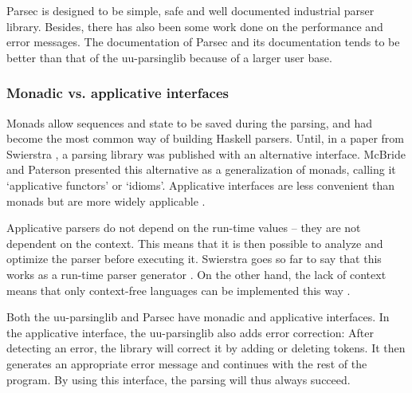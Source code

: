 Parsec is designed to be simple, safe and well documented industrial parser library.
Besides, there has also been some work done on the performance and error messages.
The documentation of Parsec and its documentation tends to be better than that of the uu-parsinglib because of a larger user base.


\subsubsection{Monadic vs. applicative interfaces}
Monads allow sequences and state to be saved during the parsing, and had become the most common way of building Haskell parsers.
Until, in a paper from Swierstra , a parsing library was published with an alternative interface.
McBride and Paterson presented this alternative as a generalization of monads, calling it `applicative functors' or `idioms'.
Applicative interfaces are less convenient than monads but are more widely applicable .

Applicative parsers do not depend on the run-time values -- they are not dependent on the context.
This means that it is then possible to analyze and optimize the parser before executing it.
Swierstra goes so far to say that this works as a run-time parser generator .
On the other hand, the lack of context means that only context-free languages can be implemented this way .

Both the uu-parsinglib and Parsec have monadic and applicative interfaces.
In the applicative interface, the uu-parsinglib also adds error correction:
After detecting an error, the library will correct it by adding or deleting tokens.
It then generates an appropriate error message and continues with the rest of the program.
By using this interface, the parsing will thus always succeed.

